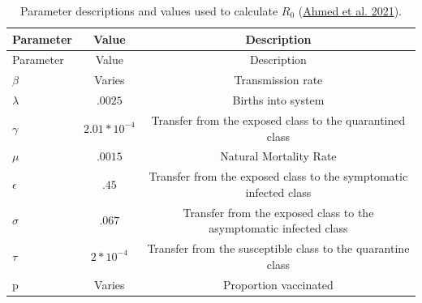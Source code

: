 \documentclass[
  12pt,
]{article}
\begin{document}
\begin{longtable}[]{@{}lcc@{}}
\caption{\label{tab:suptable1} Parameter descriptions and values used to calculate \(R_0\) (\protect\hyperlink{ref-ahmed_mathematical_2021}{Ahmed et al. 2021}).}\tabularnewline
\toprule
Parameter & Value & Description \\
\midrule
\endfirsthead
\toprule
Parameter & Value & Description \\
\midrule
\endhead
\(\beta\) & Varies & Transmission rate \\
\(\lambda\) & \(.0025\) & Births into system \\
\(\gamma\) & \(2.01*10^{-4}\) & Transfer from the exposed class to the quarantined class \\
\(\mu\) & \(.0015\) & Natural Mortality Rate \\
\(\epsilon\) & \(.45\) & Transfer from the exposed class to the symptomatic infected class \\
\(\sigma\) & \(.067\) & Transfer from the exposed class to the asymptomatic infected class \\
\(\tau\) & \(2*10^{-4}\) & Transfer from the susceptible class to the quarantine class \\
p & Varies & Proportion vaccinated \\
\bottomrule
\end{longtable}
\end{document}
